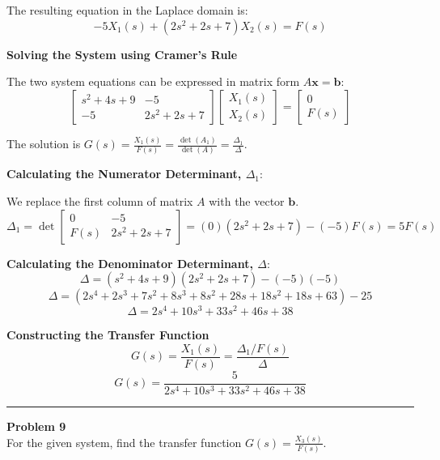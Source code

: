 \documentclass[11pt]{article}
\begin{document}
The resulting equation in the Laplace domain is:
\begin{equation}
-5X_1(s) + (2s^2 + 2s + 7)X_2(s) = F(s) \tag{2}
\end{equation}

\newpage
\noindent\textbf{Solving the System using Cramer's Rule}
\vspace{12pt}

The two system equations can be expressed in matrix form $A\mathbf{x} = \mathbf{b}$:
$$
\begin{bmatrix}
s^2 + 4s + 9 & -5 \\
-5 & 2s^2 + 2s + 7
\end{bmatrix}
\begin{bmatrix}
X_1(s) \\
X_2(s)
\end{bmatrix}
=
\begin{bmatrix}
0 \\
F(s)
\end{bmatrix}
$$

The solution is $G(s) = \frac{X_1(s)}{F(s)} = \frac{\det(A_1)}{\det(A)} = \frac{\Delta_1}{\Delta}$.

\vspace{12pt}
\noindent\textbf{Calculating the Numerator Determinant, $\Delta_1$}:
\vspace{12pt}

We replace the first column of matrix $A$ with the vector $\mathbf{b}$.
$$ \Delta_1 = \det
\begin{bmatrix}
0 & -5 \\
F(s) & 2s^2 + 2s + 7
\end{bmatrix}
= (0)(2s^2 + 2s + 7) - (-5)F(s) = 5F(s) $$

\vspace{12pt}
\noindent\textbf{Calculating the Denominator Determinant, $\Delta$}:
$$\Delta = (s^2 + 4s + 9)(2s^2 + 2s + 7) - (-5)(-5)$$
$$\Delta = (2s^4 + 2s^3 + 7s^2 + 8s^3 + 8s^2 + 28s + 18s^2 + 18s + 63) - 25$$
$$\Delta = 2s^4 + 10s^3 + 33s^2 + 46s + 38$$

\vspace{12pt}
\noindent\textbf{Constructing the Transfer Function}
$$G(s) = \frac{X_1(s)}{F(s)} = \frac{\Delta_1 / F(s)}{\Delta}$$
\[
\boxed{
G(s) = \frac{5}{2s^4 + 10s^3 + 33s^2 + 46s + 38}
}
\]




\newpage
  \setcounter{page}{16}  
\noindent\rule{\textwidth}{1pt}
\noindent\textbf{Problem 9} \hfill 
\\ For the given system, find the transfer function $G(s)=\frac{X_3(s)}{F(s)}$.
\end{document}
